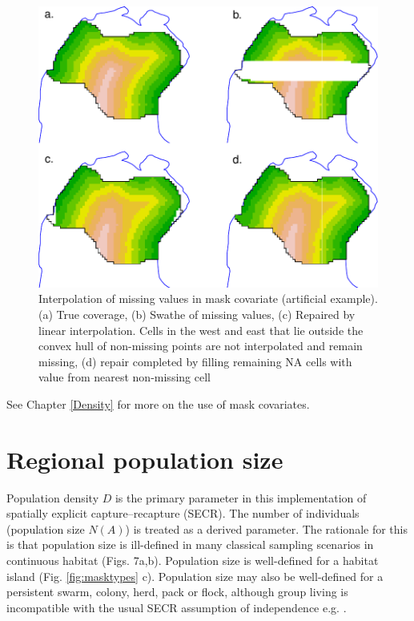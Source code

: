 \documentclass[
]{book}
\begin{document}
\begin{figure}

{\centering \includegraphics{SECRbook_files/figure-latex/fillindemo-1} 

}

\caption{Interpolation of missing values in mask covariate (artificial example). (a) True coverage, (b) Swathe of missing values, (c) Repaired by linear interpolation. Cells in the west and east that lie outside the convex hull of non-missing points are not interpolated and remain missing, (d) repair completed by filling remaining NA cells with value from nearest non-missing cell}\label{fig:fillindemo}
\end{figure}

See Chapter \ref{Density} for more on the use of mask covariates.

\section{Regional population size}\label{regional-population-size}

Population density \(D\) is the primary parameter in this implementation of spatially explicit capture--recapture (SECR). The number of individuals (population size \(N(A)\)) is treated as a derived parameter. The rationale for this is that population size is ill-defined in many classical sampling scenarios in continuous habitat (Figs. 7a,b). Population size is well-defined for a habitat island (Fig. \ref{fig:masktypes} c). Population size may also be well-defined for a persistent swarm, colony, herd, pack or flock, although group living is incompatible with the usual SECR assumption of independence e.g. \citet{Bischof2020}.
\end{document}
